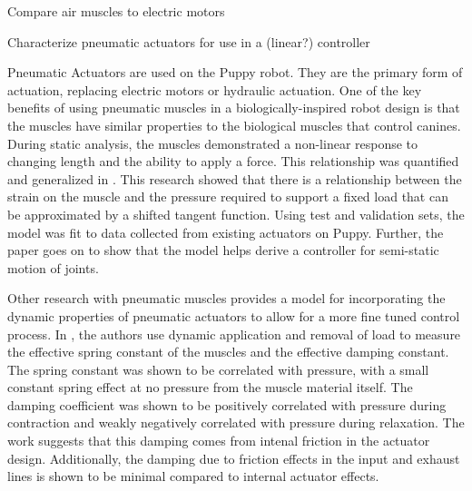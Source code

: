 
Compare air muscles to electric motors
\cite{Tavakoli2008}


Characterize pneumatic actuators for use in a (linear?) controller
\cite{Situm2008}

Pneumatic Actuators are used on the Puppy robot. They are the primary form of
actuation, replacing electric motors or hydraulic actuation. One of the key
benefits of using pneumatic muscles in a biologically-inspired robot design is
that the muscles have similar properties to the biological muscles that control
canines. 
During static analysis, the muscles demonstrated a non-linear response to
changing length and the ability to apply a force. This relationship was
quantified and generalized in \cite{HuntPMuscles}. This research showed that
there is a relationship between the strain on the muscle and the pressure
required to support a fixed load that can be approximated by a shifted tangent
function. Using test and validation sets, the model was fit to data collected
from existing actuators on Puppy. Further, the paper goes on to show that the
model helps derive a controller for semi-static motion of joints. 
\cite{HuntPMuscles}

Other research with pneumatic muscles provides a model for incorporating the
dynamic properties of pneumatic actuators to allow for a more fine tuned control
process. In \cite{DynamicPMuscles}, the authors use dynamic application and
removal of load to measure the effective spring constant of the muscles and the
effective damping constant. The spring constant was shown to be correlated with
pressure, with a small constant spring effect at no pressure from the muscle
material itself. The damping coefficient was shown to be positively correlated
with pressure during contraction and weakly negatively correlated with pressure
during relaxation. The work suggests that this damping comes from intenal
friction in the actuator design. Additionally, the damping due to friction
effects in the input and exhaust lines is shown to be minimal compared to
internal actuator effects. \cite{DynamicPMuscles}

\cite{einstein}




